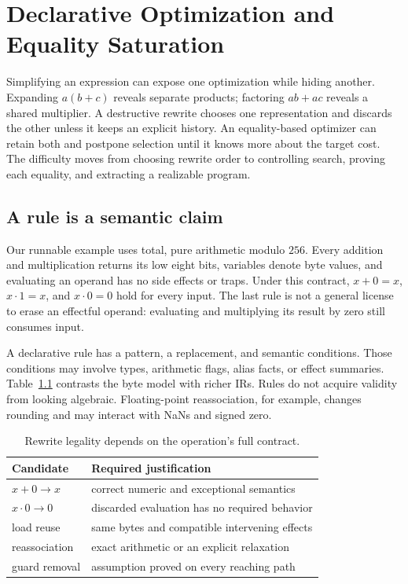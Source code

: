 \chapter{Declarative Optimization and Equality Saturation}
\label{ch:equality-saturation}

Simplifying an expression can expose one optimization while hiding another.
Expanding $a(b+c)$ reveals separate products; factoring $ab+ac$ reveals a shared multiplier.
A destructive rewrite chooses one representation and discards the other unless it keeps an explicit history.
An equality-based optimizer can retain both and postpone selection until it knows more about the target cost.
The difficulty moves from choosing rewrite order to controlling search, proving each equality, and extracting a realizable program.

\section{A rule is a semantic claim}
\label{sec:ch62-rules}

Our runnable example uses total, pure arithmetic modulo $256$.
Every addition and multiplication returns its low eight bits, variables denote byte values, and evaluating an operand has no side effects or traps.
Under this contract, $x+0=x$, $x\cdot1=x$, and $x\cdot0=0$ hold for every input.
The last rule is not a general license to erase an effectful operand: evaluating  and multiplying its result by zero still consumes input.

A declarative rule has a pattern, a replacement, and semantic conditions.
Those conditions may involve types, arithmetic flags, alias facts, or effect summaries.
Table~\ref{tab:ch62-legality} contrasts the byte model with richer IRs.
Rules do not acquire validity from looking algebraic.
Floating-point reassociation, for example, changes rounding and may interact with NaNs and signed zero.

\begin{table}[htbp]
\caption{Rewrite legality depends on the operation's full contract.}
\label{tab:ch62-legality}
\centering
\begin{tabular}{ll}
\toprule
Candidate & Required justification \\
\midrule
$x+0 \to x$ & correct numeric and exceptional semantics \\
$x\cdot0 \to0$ & discarded evaluation has no required behavior \\
load reuse & same bytes and compatible intervening effects \\
reassociation & exact arithmetic or an explicit relaxation \\
guard removal & assumption proved on every reaching path \\
\bottomrule
\end{tabular}
\end{table}

